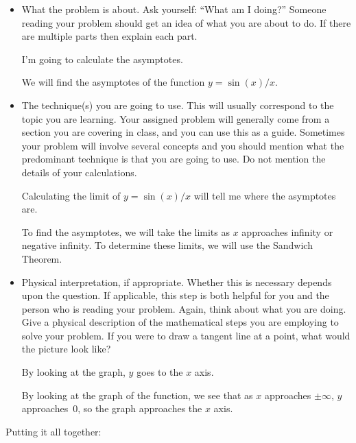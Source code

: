 \begin{itemize}
\item  What the problem is about.
 Ask yourself: ``What am I doing?''
  Someone reading your problem should get an idea of what you are
  about to do. If there are multiple parts then explain each part.

\begin{badexample}
I'm going to calculate the asymptotes.
\end{badexample}

\begin{goodexample}
We will find
  the asymptotes of the function $y=\sin(x)/x$.\\
\end{goodexample}
  
\item The technique(s) you are going to use.
 This will usually correspond to
  the topic you are learning.  Your assigned problem will generally
  come from a section you are covering in class, and you can use this
as a guide.   Sometimes your
  problem will involve several concepts and you should mention what
  the predominant technique is that you are going to use. Do not
  mention the details of your calculations.

\begin{badexample}  
Calculating the limit of $y=\sin(x)/x$ will tell me where
  the asymptotes are.  
\end{badexample}

\begin{goodexample}
To find the asymptotes, we will take the limits as $x$ approaches
infinity or negative infinity. To determine these limits, we will use
the Sandwich Theorem.\\
\end{goodexample}

\item Physical interpretation, if appropriate.
  Whether this
  is necessary depends upon the question. If applicable, this step is
  both helpful for you and the person who is reading your problem.
  Again, think about what you are doing. Give a physical description
  of the mathematical steps you are employing to solve your problem.
  If you were to draw a tangent line at a point, what would the
  picture look like?

\begin{badexample}  
By looking at the graph, $y$ goes to the $x$ axis.
\end{badexample}

\begin{goodexample}
By looking at the graph of the function, we see that as $x$ approaches
$\pm\infty$, $y$ approaches~0, so the graph approaches the $x$ axis.\\
\end{goodexample}
 

\end{itemize}
Putting it
  all together: 

